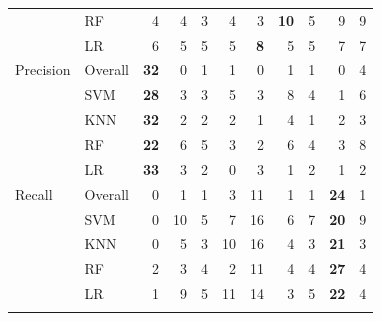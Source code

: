 \begin{table}[pos=p]
{\begin{tabular}{llrrrrrrrrr}
 & RF & 4 & 4 & 3 & 4 & 3 & \textbf{10} & 5 & 9 & 9 \\
 & LR & 6 & 5 & 5 & 5 & \textbf{8} & 5 & 5 & 7 & 7 \\
\addlinespace[2pt]
Precision & Overall & \textbf{32} & 0 & 1 & 1 & 0 & 1 & 1 & 0 & 4 \\
 & SVM & \textbf{28} & 3 & 3 & 5 & 3 & 8 & 4 & 1 & 6 \\
 & KNN & \textbf{32} & 2 & 2 & 2 & 1 & 4 & 1 & 2 & 3 \\
 & RF & \textbf{22} & 6 & 5 & 3 & 2 & 6 & 4 & 3 & 8 \\
 & LR & \textbf{33} & 3 & 2 & 0 & 3 & 1 & 2 & 1 & 2 \\
\addlinespace[2pt]
Recall & Overall & 0 & 1 & 1 & 3 & 11 & 1 & 1 & \textbf{24} & 1 \\
 & SVM & 0 & 10 & 5 & 7 & 16 & 6 & 7 & \textbf{20} & 9 \\
 & KNN & 0 & 5 & 3 & 10 & 16 & 4 & 3 & \textbf{21} & 3 \\
 & RF & 2 & 3 & 4 & 2 & 11 & 4 & 4 & \textbf{27} & 4 \\
 & LR & 1 & 9 & 5 & 11 & 14 & 3 & 5 & \textbf{22} & 4 \\
\addlinespace[2pt]
\bottomrule\end{tabular}}\par\vspace{5pt}
\end{table}
